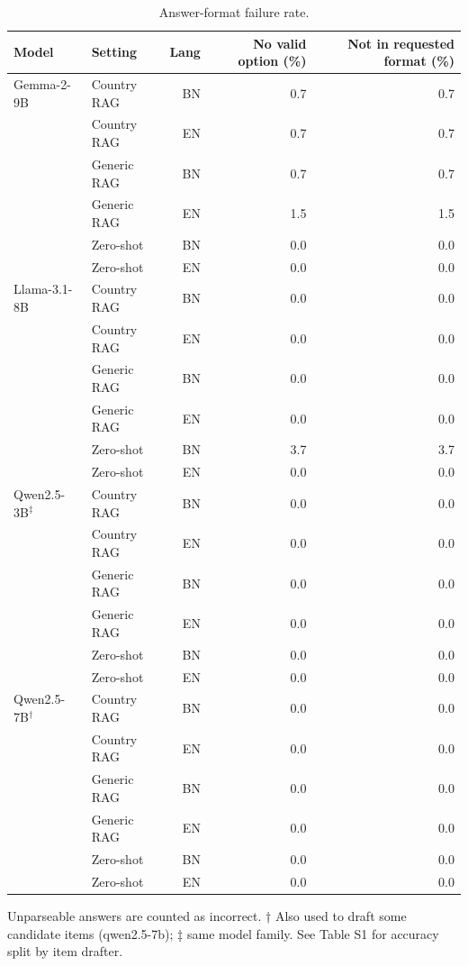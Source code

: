 \begin{table}[t]
\centering
\footnotesize
\caption{Answer-format failure rate.}
\label{tab:format}
\begin{tabular}{llrrr}
\toprule
Model & Setting & Lang & No valid option (\%) & Not in requested format (\%) \\
\midrule
Gemma-2-9B & Country RAG & BN & 0.7 & 0.7 \\
 & Country RAG & EN & 0.7 & 0.7 \\
 & Generic RAG & BN & 0.7 & 0.7 \\
 & Generic RAG & EN & 1.5 & 1.5 \\
 & Zero-shot & BN & 0.0 & 0.0 \\
 & Zero-shot & EN & 0.0 & 0.0 \\
\addlinespace
Llama-3.1-8B & Country RAG & BN & 0.0 & 0.0 \\
 & Country RAG & EN & 0.0 & 0.0 \\
 & Generic RAG & BN & 0.0 & 0.0 \\
 & Generic RAG & EN & 0.0 & 0.0 \\
 & Zero-shot & BN & 3.7 & 3.7 \\
 & Zero-shot & EN & 0.0 & 0.0 \\
\addlinespace
Qwen2.5-3B$^\ddagger$ & Country RAG & BN & 0.0 & 0.0 \\
 & Country RAG & EN & 0.0 & 0.0 \\
 & Generic RAG & BN & 0.0 & 0.0 \\
 & Generic RAG & EN & 0.0 & 0.0 \\
 & Zero-shot & BN & 0.0 & 0.0 \\
 & Zero-shot & EN & 0.0 & 0.0 \\
\addlinespace
Qwen2.5-7B$^\dagger$ & Country RAG & BN & 0.0 & 0.0 \\
 & Country RAG & EN & 0.0 & 0.0 \\
 & Generic RAG & BN & 0.0 & 0.0 \\
 & Generic RAG & EN & 0.0 & 0.0 \\
 & Zero-shot & BN & 0.0 & 0.0 \\
 & Zero-shot & EN & 0.0 & 0.0 \\
\bottomrule
\end{tabular}
\par\smallskip\parbox{\linewidth}{\scriptsize Unparseable answers are counted as incorrect. † Also used to draft some candidate items (qwen2.5-7b); ‡ same model family. See Table S1 for accuracy split by item drafter.}
\end{table}

